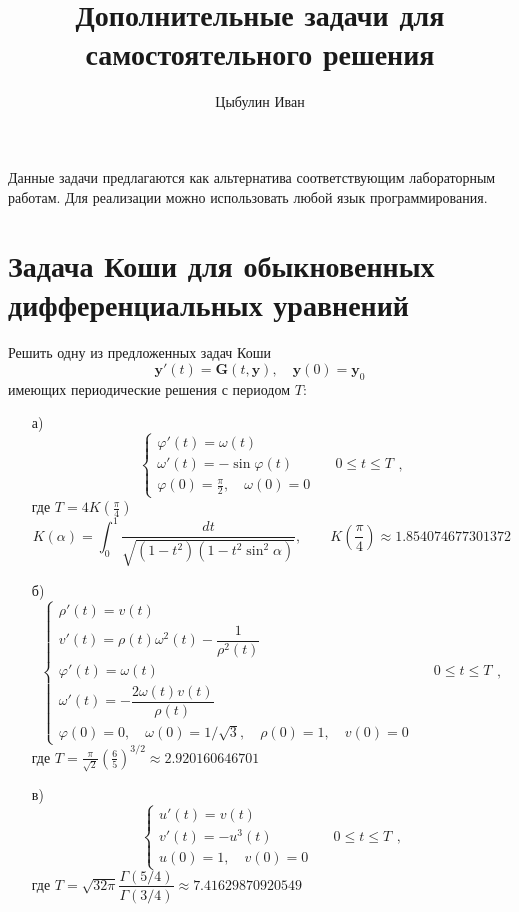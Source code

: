 \documentclass[10pt]{article}
\title{Дополнительные задачи для самостоятельного решения}
\author{Цыбулин Иван}
\begin{document}
\maketitle

Данные задачи предлагаются как альтернатива соответствующим лабораторным
работам. Для реализации можно использовать любой язык программирования.

\section{Задача Коши для обыкновенных дифференциальных уравнений}
Решить одну из предложенных задач Коши
\[
\mathbf{y}'(t) = \mathbf{G}(t, \mathbf{y}), \quad \mathbf{y}(0) = \mathbf{y}_0
\]
имеющих периодические решения с периодом $T$:
\begin{enumerate}
\item[а)]
\begin{equation*}
\begin{cases}
\varphi'(t) = \omega(t)\\
\omega'(t) = -\sin \varphi(t) &\quad
0 \leq t \leq T\\
\varphi(0) = \frac{\pi}{2}, \quad \omega(0) = 0
\end{cases},
\end{equation*}
где $T = 4 K\left(\frac{\pi}{4}\right)$
\[
K(\alpha) = \int_0^1 \frac{dt}{\sqrt{(1-t^2)(1-t^2 \sin^2 \alpha)}}, \qquad
K\left(\frac{\pi}{4}\right) \approx 1.854074677301372
\]
\item[б)]
\begin{equation*}
\begin{cases}
\rho'(t) = v(t)\\
v'(t) = \rho(t)\omega^2(t) - \dfrac{1}{\rho^2(t)}\\
\varphi'(t) = \omega(t) &\quad 0 \leq t \leq T\\
\omega'(t) = -\dfrac{2\omega(t)v(t)}{\rho(t)}\\ 
\varphi(0) = 0, \quad \omega(0) = 1 / \sqrt{3},
\quad \rho(0) = 1, \quad v(0) = 0
\end{cases},
\end{equation*}
где $T = \frac{\pi}{\sqrt{2}} \left(\frac{6}{5}\right)^{3/2} \approx 2.920160646701$
\item[в)]
\begin{equation*}
\begin{cases}
u'(t) = v(t)\\
v'(t) = -u^3(t) &\quad
0 \leq t \leq T\\
u(0) = 1, \quad v(0) = 0
\end{cases},
\end{equation*}
где $T = \sqrt{32\pi} \dfrac{\Gamma(5/4)}{\Gamma(3/4)} \approx 7.41629870920549$
\end{enumerate}
\end{document}
